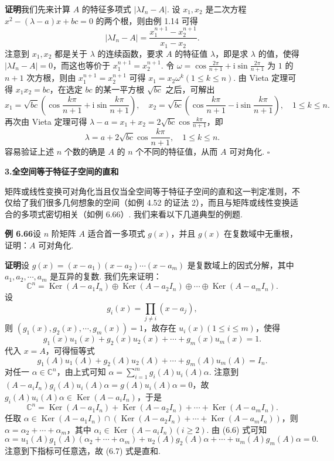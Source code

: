 \documentclass[UTF8,12pt,a4paper,fontset=fandol]{ctexart}
\begin{document}
\noindent\textbf{证明}\quad 我们先来计算 $A$ 的特征多项式 $|\lambda I_n-A|$. 设 $x_1,x_2$ 是二次方程 $x^2-(\lambda-a)x+bc=0$ 的两个根，则由例 1.14 可得
\[
|\lambda I_n-A|=\frac{x_1^{n+1}-x_2^{n+1}}{x_1-x_2}.
\]
注意到 $x_1,x_2$ 都是关于 $\lambda$ 的连续函数，要求 $A$ 的特征值 $\lambda$，即是求 $\lambda$ 的值，使得 $|\lambda I_n-A|=0$，而这也等价于 $x_1^{n+1}=x_2^{n+1}$. 令 $\omega=\cos\frac{2\pi}{n+1}+\mathrm{i}\sin\frac{2\pi}{n+1}$ 为 $1$ 的 $n+1$ 次方根，则由 $x_1^{n+1}=x_2^{n+1}$ 可得 $x_1=x_2\omega^k(1\le k\le n)$. 由 Vieta 定理可得 $x_1x_2=bc$，在选定 $bc$ 的某一平方根 $\sqrt{bc}$ 之后，可解出
\[
x_1=\sqrt{bc}\left(\cos\frac{k\pi}{n+1}+\mathrm{i}\sin\frac{k\pi}{n+1}\right),\quad
x_2=\sqrt{bc}\left(\cos\frac{k\pi}{n+1}-\mathrm{i}\sin\frac{k\pi}{n+1}\right),\quad 1\le k\le n.
\]
再次由 Vieta 定理可得 $\lambda-a=x_1+x_2=2\sqrt{bc}\cos\frac{k\pi}{n+1}$，即
\[
\lambda=a+2\sqrt{bc}\cos\frac{k\pi}{n+1},\quad 1\le k\le n.
\]
容易验证上述 $n$ 个数的确是 $A$ 的 $n$ 个不同的特征值，从而 $A$ 可对角化. $\square$

\noindent\textbf{3.\quad 全空间等于特征子空间的直和}

矩阵或线性变换可对角化当且仅当全空间等于特征子空间的直和这一判定准则，不仅给了我们很多几何想象的空间（如例 4.52 的证法 2），而且与矩阵或线性变换适合的多项式密切相关（如例 6.66）. 我们来看以下几道典型的例题.

\noindent\textbf{例 6.66}\quad 设 $n$ 阶矩阵 $A$ 适合首一多项式 $g(x)$，并且 $g(x)$ 在复数域中无重根，证明：$A$ 可对角化.

\noindent\textbf{证明}\quad 设 $g(x)=(x-a_1)(x-a_2)\cdots(x-a_m)$ 是复数域上的因式分解，其中 $a_1,a_2,\cdots,a_m$ 是互异的复数. 我们先来证明：
\begin{equation}
\mathbb{C}^n=\operatorname{Ker}(A-a_1I_n)\oplus\operatorname{Ker}(A-a_2I_n)\oplus\cdots\oplus\operatorname{Ker}(A-a_mI_n).
\tag{6.5}
\end{equation}
设
\[
g_i(x)=\prod_{j\ne i}(x-a_j),
\]
则 $(g_1(x),g_2(x),\cdots,g_m(x))=1$，故存在 $u_i(x)(1\le i\le m)$，使得
\[
g_1(x)u_1(x)+g_2(x)u_2(x)+\cdots+g_m(x)u_m(x)=1.
\]
代入 $x=A$，可得恒等式
\begin{equation}
g_1(A)u_1(A)+g_2(A)u_2(A)+\cdots+g_m(A)u_m(A)=I_n.
\tag{6.6}
\end{equation}
对任一 $\alpha\in\mathbb{C}^n$，由上式可知 $\alpha=\sum_{i=1}^m g_i(A)u_i(A)\alpha$. 注意到 $(A-a_iI_n)g_i(A)u_i(A)\alpha=g(A)u_i(A)\alpha=0$，故 $g_i(A)u_i(A)\alpha\in\operatorname{Ker}(A-a_iI_n)$，于是
\begin{equation}
\mathbb{C}^n=\operatorname{Ker}(A-a_1I_n)+\operatorname{Ker}(A-a_2I_n)+\cdots+\operatorname{Ker}(A-a_mI_n).
\tag{6.7}
\end{equation}
任取 $\alpha\in\operatorname{Ker}(A-a_1I_n)\cap(\operatorname{Ker}(A-a_2I_n)+\cdots+\operatorname{Ker}(A-a_mI_n))$，则 $\alpha=\alpha_2+\cdots+\alpha_m$，其中 $\alpha_i\in\operatorname{Ker}(A-a_iI_n)(i\ge 2)$. 由 (6.6) 式可知
\[
\alpha=u_1(A)g_1(A)(\alpha_2+\cdots+\alpha_m)+u_2(A)g_2(A)\alpha+\cdots+u_m(A)g_m(A)\alpha=0.
\]
注意到下指标可任意选，故 (6.7) 式是直和.
\end{document}
